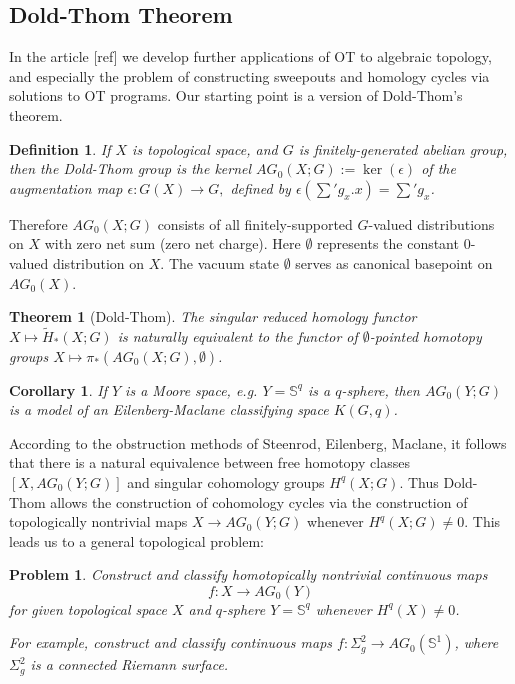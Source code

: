 \documentclass[12pt]{amsart}
\newtheorem*{thm}{Theorem}
\newtheorem{prob}{Problem}
\newtheorem*{cor}{Corollary}
\newtheorem{dfn}{Definition}
\theoremstyle{remark}
\begin{document}
\subsection{Dold-Thom Theorem}
In the article [ref] we develop further applications of OT to algebraic topology, and especially the problem of constructing sweepouts and homology cycles via solutions to OT programs. Our starting point is a version of Dold-Thom's theorem. 

\begin{dfn} If $X$ is topological space, and $G$ is finitely-generated abelian group, then the Dold-Thom group is the kernel $AG_0(X;G):=\ker(\epsilon)$ of the augmentation map $\epsilon: G(X) \to G,$ defined by $\epsilon(\sum' g_x .x)=\sum' g_x$. 
\end{dfn}

Therefore $AG_0(X;G)$ consists of all finitely-supported $G$-valued distributions on $X$ with zero net sum (zero net charge). Here $\emptyset$ represents the constant $0$-valued distribution on $X$. The vacuum state $\emptyset$ serves as canonical basepoint on $AG_0(X)$.

\begin{thm}[Dold-Thom]
The singular reduced homology functor $X\mapsto \tilde{H}_*(X;G)$ is naturally equivalent to the functor of $\emptyset$-pointed homotopy groups $X\mapsto \pi_*(AG_0(X;G), \emptyset)$.
\end{thm}

\begin{cor}
If $Y$ is a Moore space, e.g. $Y=\mathbb{S}^q$ is a $q$-sphere, then $AG_0(Y;G)$ is a model of an Eilenberg-Maclane classifying space $K(G,q)$.
\end{cor}

According to the obstruction methods of Steenrod, Eilenberg, Maclane, it follows that there is a natural equivalence between free homotopy classes $[X, AG_0(Y;G)]$ and singular cohomology groups $H^q(X;G)$. Thus Dold-Thom allows the construction of cohomology cycles via the construction of topologically nontrivial maps $X\to AG_0(Y;G)$ whenever $H^q(X;G)\neq 0$. This leads us to a general topological problem: 

\begin{prob}
\label{dt1}
Construct and classify homotopically nontrivial continuous maps $$f: X \to AG_0(Y)$$ for given topological space $X$ and $q$-sphere $Y=\mathbb{S}^q$ whenever $H^q(X)\neq 0$. 

For example, construct and classify continuous maps $f: \Sigma^2_g \to AG_0(\mathbb{S}^1)$, where $\Sigma_g^2$ is a connected Riemann surface.
\end{prob}
\end{document}
